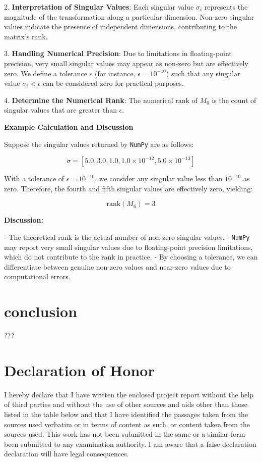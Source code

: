 \documentclass[a4paper,oneside,bibliography=totoc]{scrartcl}
\begin{document}
2. \textbf{Interpretation of Singular Values}:
    Each singular value \( \sigma_i \) represents the magnitude of the transformation along a particular dimension.
    Non-zero singular values indicate the presence of independent dimensions, contributing to the matrix's rank.

3. \textbf{Handling Numerical Precision}:
    Due to limitations in floating-point precision, very small singular values may appear as non-zero but are effectively zero.
    We define a tolerance \( \epsilon \) (for instance, \( \epsilon = 10^{-10} \)) such that any singular value \( \sigma_i < \epsilon \) can be considered zero for practical purposes.

4. \textbf{Determine the Numerical Rank}:
    The numerical rank of \( M_6 \) is the count of singular values that are greater than \( \epsilon \).

\textbf{Example Calculation and Discussion}

Suppose the singular values returned by \texttt{NumPy} are as follows:

\[
\sigma = [5.0, 3.0, 1.0, 1.0 \times 10^{-12}, 5.0 \times 10^{-13}]
\]

With a tolerance of \( \epsilon = 10^{-10} \), we consider any singular value less than \( 10^{-10} \) as zero. Therefore, the fourth and fifth singular values are effectively zero, yielding:

\[
\text{rank}(M_6) = 3
\]

\textbf{Discussion:} 

- The theoretical rank is the actual number of non-zero singular values.
- \texttt{NumPy} may report very small singular values due to floating-point precision limitations, which do not contribute to the rank in practice.
- By choosing a tolerance, we can differentiate between genuine non-zero values and near-zero values due to computational errors.


\section{conclusion}
???




\appendix


\clearpage
\section*{Declaration of Honor}

I hereby declare that I have written the enclosed 
project report without the help of third parties and without the use of other
sources and aids other than those listed in the table below
and that I have identified the passages taken from the sources used verbatim or in terms of content as such.
or content taken from the sources used. This work has not been submitted in the same or a similar form
been submitted to any examination authority. I am aware that a false declaration
declaration will have legal consequences.
\end{document}
